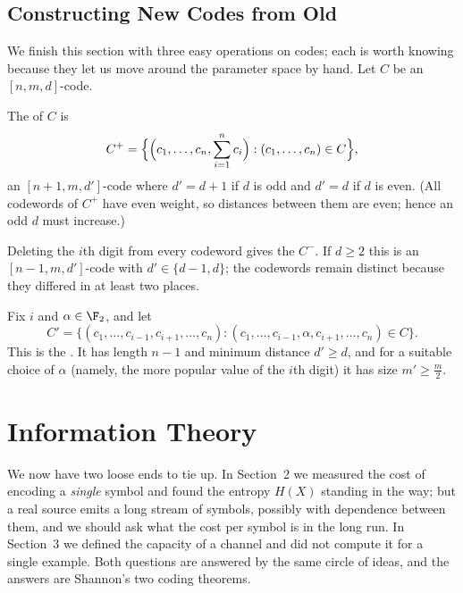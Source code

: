 \subsection{Constructing New Codes from Old}

We finish this section with three easy operations on codes; each is worth knowing because they let us move around the parameter space by hand. Let $C$ be an $[n,m,d]$-code.

\begin{example}
	The  of $C$ is
	$$C^+ = \Bigl\{\Bigl(c_1, \dots, c_n, \sum_{i=1}^n c_i\Bigr) : (c_1,\dots,c_n) \in C\Bigr\},$$
	an $[n+1,m,d']$-code where $d' = d+1$ if $d$ is odd and $d' = d$ if $d$ is even. (All codewords of $C^+$ have even weight, so distances between them are even; hence an odd $d$ must increase.)
\end{example}

\begin{example}
	Deleting the $i$th digit from every codeword gives the  $C^-$. If $d \ge 2$ this is an $[n-1,m,d']$-code with $d' \in \{d-1, d\}$; the codewords remain distinct because they differed in at least two places.
\end{example}

\begin{example}
	Fix $i$ and $\alpha \in \F_2$, and let
	$$C' = \{(c_1,\dots,c_{i-1},c_{i+1},\dots,c_n) : (c_1,\dots,c_{i-1},\alpha,c_{i+1},\dots,c_n) \in C\}.$$
	This is the . It has length $n-1$ and minimum distance $d' \ge d$, and for a suitable choice of $\alpha$ (namely, the more popular value of the $i$th digit) it has size $m' \ge \frac{m}{2}$.
\end{example}


\section{Information Theory}\label{sec:infotheory}

We now have two loose ends to tie up. In Section~2 we measured the cost of encoding a \emph{single} symbol and found the entropy $H(X)$ standing in the way; but a real source emits a long stream of symbols, possibly with dependence between them, and we should ask what the cost per symbol is in the long run. In Section~3 we defined the capacity of a channel and did not compute it for a single example. Both questions are answered by the same circle of ideas, and the answers are Shannon's two coding theorems.

